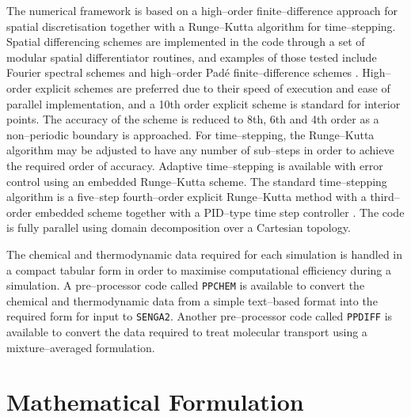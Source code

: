 \documentclass[dvips]{article}
\begin{document}
The numerical framework is based on a high--order finite--difference approach
for spatial discretisation together with a Runge--Kutta algorithm for
time--stepping.
Spatial differencing schemes are implemented in the code through a set
of modular spatial differentiator routines, and examples of those tested 
include Fourier spectral schemes and high--order Pad\'{e}
finite--difference schemes \cite{Lele}.
High--order explicit schemes are preferred due to their speed of
execution and ease of parallel implementation, and a 10th order explicit
scheme is standard for interior points.  The accuracy of the scheme is
reduced to 8th, 6th and 4th order as a non--periodic boundary is approached.
For time--stepping, the Runge--Kutta algorithm may be adjusted to have any
number of sub--steps in order to achieve the required order of accuracy.
Adaptive time--stepping is available with error control using an embedded
Runge--Kutta scheme.  The standard time--stepping algorithm is a
five--step fourth--order explicit Runge--Kutta method with a third--order
embedded scheme \cite{KennedyCarpenterLewis} together with
a PID--type time step controller \cite{KennedyCarpenter}.  The code is fully
parallel using domain decomposition over a Cartesian topology.

The chemical and thermodynamic data required for each simulation is
handled in a compact tabular form in order to maximise computational
efficiency during a simulation.  A pre--processor code called {\tt PPCHEM} is
available to convert the chemical and thermodynamic data from a simple
text--based format into the required form for input to {\tt SENGA2}.  Another
pre--processor code called {\tt PPDIFF} is available to convert the data
required to treat molecular transport using a mixture--averaged formulation. 

\section{Mathematical Formulation}
\end{document}
